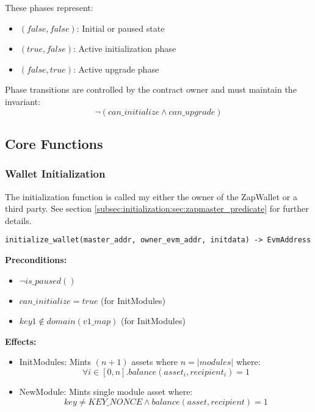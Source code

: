 These phases represent:
\begin{itemize}
    \item $(false,false)$: Initial or paused state
    \item $(true,false)$: Active initialization phase
    \item $(false,true)$: Active upgrade phase
\end{itemize}

Phase transitions are controlled by the contract owner and must maintain the invariant:
\[ \neg(can\_initialize \land can\_upgrade) \]


\subsection{Core Functions}

\subsubsection{Wallet Initialization}

The initialization function is called my either the owner of the ZapWallet or a third party. See section \ref{subsec:initialization:sec:zapmaster_predicate} for
further details.\\

\begin{lstlisting}
initialize_wallet(master_addr, owner_evm_addr, initdata) -> EvmAddress
\end{lstlisting}



\textbf{Preconditions:}
\begin{itemize}
    \item $\neg is\_paused()$
    \item $can\_initialize = true$ (for InitModules)
    \item $key1 \notin domain(v1\_map)$ (for InitModules)
\end{itemize}

\textbf{Effects:}
\begin{itemize}
    \item InitModules: Mints $(n+1)$ assets where $n = |modules|$ where:
        \[ \forall i \in [0,n]. balance(asset_i, recipient_i) = 1 \]
    \item NewModule: Mints single module asset where:
        \[ key \neq KEY\_NONCE \land balance(asset, recipient) = 1 \]
\end{itemize}

